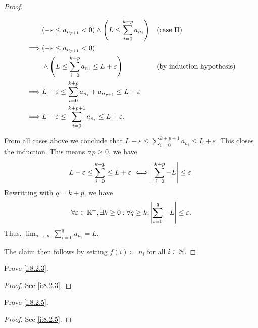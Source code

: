 \begin{proof}
\begin{itemize}
\begin{itemize}
\begin{align*}
                             & (-\varepsilon \leq a_{n_{p + 1}} < 0) \land \Bigg(L \leq \sum_{i = 0}^{k + p} a_{n_i}\Bigg) &  & \text{(case II)} \\
                    \implies & (-\varepsilon \leq a_{n_{p + 1}} < 0)                                                                             \\
                             & \land \Bigg(L \leq \sum_{i = 0}^{k + p} a_{n_i} \leq L + \varepsilon\Bigg)                  &  & \text{(by induction hypothesis)}            \\
                    \implies & L - \varepsilon \leq \sum_{i = 0}^{k + p} a_{n_i} + a_{n_{p + 1}} \leq L + \varepsilon                            \\
                    \implies & L - \varepsilon \leq \sum_{i = 0}^{k + p + 1} a_{n_i} \leq L + \varepsilon.
                  \end{align*}
          \end{itemize}
          From all cases above we conclude that \(L - \varepsilon \leq \sum_{i = 0}^{k + p + 1} a_{n_i} \leq L + \varepsilon\).
          This closes the induction.
          This means \(\forall p \geq 0\), we have
          \[
            L - \varepsilon \leq \sum_{i = 0}^{k + p} \leq L + \varepsilon \iff \left\lvert\sum_{i = 0}^{k + p} - L\right\rvert \leq \varepsilon.
          \]
          Rewritting with \(q = k + p\), we have
          \[
            \forall \varepsilon \in \mathbb{R}^+, \exists k \geq 0 : \forall q \geq k, \left\lvert\sum_{i = 0}^q - L\right\rvert \leq \varepsilon.
          \]
          Thus, \(\lim_{q \to \infty} \sum_{i = 0}^q a_{n_i} = L\).
  \end{itemize}
  The claim then follows by setting \(f(i) \coloneqq n_i\) for all \(i \in \mathbb{N}\).
\end{proof}

\exercisesection

\begin{ex}\label{i:ex:8.2.1}
  Prove \cref{i:8.2.3}.
\end{ex}

\begin{proof}
  See \cref{i:8.2.3}.
\end{proof}

\begin{ex}\label{i:ex:8.2.2}
  Prove \cref{i:8.2.5}.
\end{ex}

\begin{proof}
  See \cref{i:8.2.5}.
\end{proof}

